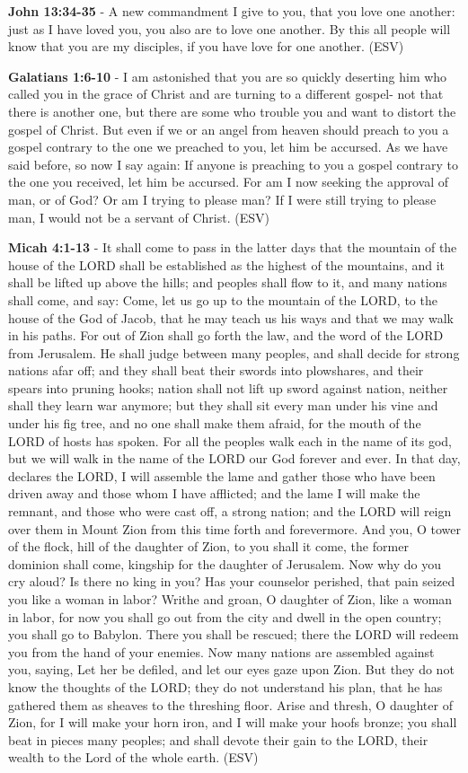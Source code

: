 \documentclass[11pt]{article}
\begin{document}
\textbf{John 13:34-35} - A new commandment I give to you, that you love one another: just as I have loved you, you also are to love one another. By this all people will know that you are my disciples, if you have love for one another. (ESV)

\textbf{Galatians 1:6-10} - I am astonished that you are so quickly deserting him who called you in the grace of Christ and are turning to a different gospel- not that there is another one, but there are some who trouble you and want to distort the gospel of Christ. But even if we or an angel from heaven should preach to you a gospel contrary to the one we preached to you, let him be accursed. As we have said before, so now I say again: If anyone is preaching to you a gospel contrary to the one you received, let him be accursed. For am I now seeking the approval of man, or of God? Or am I trying to please man? If I were still trying to please man, I would not be a servant of Christ. (ESV)

\textbf{Micah 4:1-13} - It shall come to pass in the latter days that the mountain of the house of the LORD shall be established as the highest of the mountains, and it shall be lifted up above the hills; and peoples shall flow to it, and many nations shall come, and say: Come, let us go up to the mountain of the LORD, to the house of the God of Jacob, that he may teach us his ways and that we may walk in his paths. For out of Zion shall go forth the law, and the word of the LORD from Jerusalem. He shall judge between many peoples, and shall decide for strong nations afar off; and they shall beat their swords into plowshares, and their spears into pruning hooks; nation shall not lift up sword against nation, neither shall they learn war anymore; but they shall sit every man under his vine and under his fig tree, and no one shall make them afraid, for the mouth of the LORD of hosts has spoken. For all the peoples walk each in the name of its god, but we will walk in the name of the LORD our God forever and ever. In that day, declares the LORD, I will assemble the lame and gather those who have been driven away and those whom I have afflicted; and the lame I will make the remnant, and those who were cast off, a strong nation; and the LORD will reign over them in Mount Zion from this time forth and forevermore. And you, O tower of the flock, hill of the daughter of Zion, to you shall it come, the former dominion shall come, kingship for the daughter of Jerusalem. Now why do you cry aloud? Is there no king in you? Has your counselor perished, that pain seized you like a woman in labor? Writhe and groan, O daughter of Zion, like a woman in labor, for now you shall go out from the city and dwell in the open country; you shall go to Babylon. There you shall be rescued; there the LORD will redeem you from the hand of your enemies. Now many nations are assembled against you, saying, Let her be defiled, and let our eyes gaze upon Zion. But they do not know the thoughts of the LORD; they do not understand his plan, that he has gathered them as sheaves to the threshing floor. Arise and thresh, O daughter of Zion, for I will make your horn iron, and I will make your hoofs bronze; you shall beat in pieces many peoples; and shall devote their gain to the LORD, their wealth to the Lord of the whole earth. (ESV)
\end{document}
